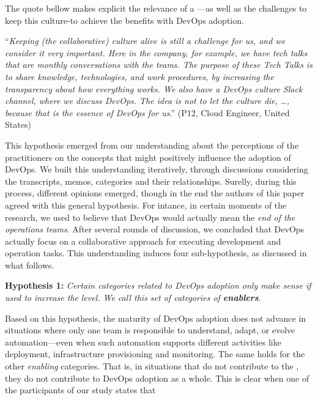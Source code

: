 The quote bellow makes explicit the relevance of a \cc
---as well as the challenges to keep this culture-to
achieve the benefits with DevOps adoption.

\begin{mq}
  ``\emph{Keeping (the collaborative) culture alive is still a challenge for us,
  and we consider it very important. Here in the company, for example, we have
  tech talks that are monthly conversations with the teams. The
  purpose of these Tech Talks is to share knowledge, technologies, and work
  procedures, by increasing the transparency about how everything works. We also
  have a DevOps culture Slack channel, where we discuss DevOps. The idea
  is not to let the culture die, \ldots, because that is the essence of
  DevOps for us}.'' (P12, Cloud Engineer, United States)
\end{mq}


This hypothesis emerged from our understanding about the
perceptions of the practitioners on the concepts that might
positively influence the adoption of DevOps. We built
this understanding iteratively, through discussions
considering the transcripts, memos, categories and their relationships. Surelly, during this
process, different opinions emerged, though in the end
the authors of this paper agreed with this general hypothesis.
For intance, in certain moments of the research, we used to believe that DevOps would
actually mean the \emph{end of the operations teams}. After
several rounds of discussion, we concluded that DevOps actually
focus on a collaborative approach for executing development and
operation tasks. This understanding induces four sub-hypothesis, as discussed in what
follows.

\begin{mh}
\textbf{Hypothesis 1:} \textit{Certain categories related to DevOps adoption
only make sense if used to increase the} \cc \emph{level. We
call this set of categories of \textbf{enablers}}.
\end{mh}

Based on this hypothesis, the maturity of DevOps adoption does not
advance in situations where only one team is responsible to understand, adapt, or
evolve automation---even when such automation supports different activities like
deployment, infrastructure provisioning and monitoring. The same holds for the
other \emph{enabling} categories. That is, in situations that
 do not contribute to
the \cc, they do not contribute to DevOps adoption as a whole. This is
clear when one of the participants of our study states that

